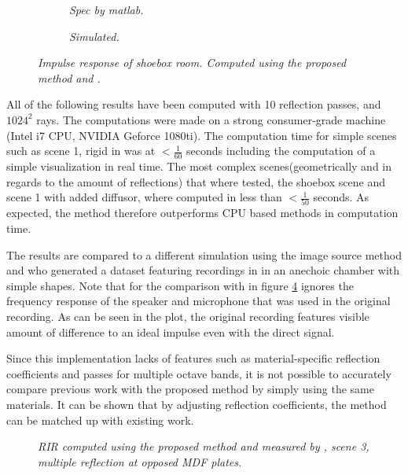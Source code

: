 \documentclass[twoside,a4paper]{article}
\begin{document}
\begin{figure}[ht]
    \center
    \begin{subfigure}[t]{0.45\textwidth}
      \centering
      
    \caption{\label{fig:shoe} \it Spec by matlab. }
    \end{subfigure}%
    \begin{subfigure}[t]{0.45\textwidth}
      \centering
      
      \caption{\label{fig:shoe} \it Simulated. }
    \end{subfigure}
    \caption{\it Impulse response of shoebox room. Computed using the proposed method and \cite{lehmann_fast_2020}.}
    \label{fig:test}
\end{figure}


All of the following results have been computed with 10 reflection passes, and $1024^2$ rays. The computations were made on a strong consumer-grade machine (Intel i7 CPU, NVIDIA Geforce 1080ti). The computation time for simple scenes such as scene 1, rigid in \cite{brinkmann_round_2019} was at $<\frac{1}{60}$ seconds including the computation of a simple visualization in real time. The most complex scenes(geometrically and in regards to the amount of reflections) that where tested, the shoebox scene and scene 1 with added diffusor, where computed in less than $<\frac{1}{50}$ seconds. As expected, the method therefore outperforms CPU based methods in computation time.  \

The results are compared to a different simulation using the image source method \cite{lehmann_fast_2020} and \cite{brinkmann_round_2019} who generated a dataset featuring recordings in in an anechoic chamber with simple shapes. Note that for the comparison with \cite{brinkmann_round_2019} in figure \ref{fig:multRefl} ignores the frequency response of the speaker and microphone that was used in the original recording. As can be seen in the plot, the original recording features visible amount of difference to an ideal impulse even with the direct signal. 

Since this implementation lacks of features such as material-specific reflection coefficients and passes for multiple octave bands, it is not possible to accurately compare previous work with the proposed method by simply using the same materials. It can be shown that by adjusting reflection coefficients, the method can be matched up with existing work.

\begin{figure}

    \begin{center}
      
    \end{center}
    
    \caption{\label{fig:multRefl} \it RIR computed using the proposed method and measured by \cite{brinkmann_round_2019}, scene 3, multiple reflection at opposed MDF plates.}
\end{figure}
\end{document}
